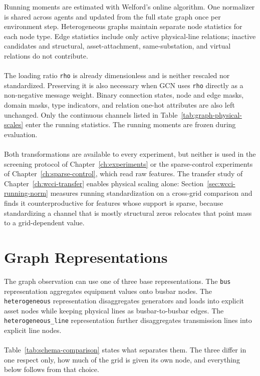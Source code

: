 Running moments are estimated with Welford's online algorithm. One normalizer
is shared across agents and updated from the full state graph once per
environment step. Heterogeneous graphs maintain separate node statistics for
each node type. Edge statistics include only active physical-line relations;
inactive candidates and structural, asset-attachment, same-substation, and
virtual relations do not contribute.
\\
\\
The loading ratio \texttt{rho} is already dimensionless and is neither rescaled
nor standardized. Preserving it is also necessary when GCN uses \texttt{rho}
directly as a non-negative message weight. Binary connection states, node and
edge masks, domain masks, type indicators, and relation one-hot attributes are
also left unchanged. Only the continuous channels listed in
Table~\ref{tab:graph-physical-scales} enter the running statistics.
The running moments are frozen during evaluation.
\\
\\
Both transformations are available to every experiment, but neither is used in
the screening protocol of Chapter~\ref{ch:experiments} or the sparse-control
experiments of Chapter~\ref{ch:sparse-control}, which read raw features. The
transfer study of Chapter~\ref{ch:wcci-transfer} enables physical scaling alone:
Section~\ref{sec:wcci-running-norm} measures running standardization on a
cross-grid comparison and finds it counterproductive for features whose support
is sparse, because standardizing a channel that is mostly structural zeros
relocates that point mass to a grid-dependent value.


\section{Graph Representations}
\label{sec:graph-representation}

The graph observation can use one of three base representations. The
\texttt{bus} representation aggregates equipment values onto busbar nodes. The
\texttt{heterogeneous} representation disaggregates generators and loads into
explicit asset nodes while keeping physical lines as busbar-to-busbar edges. The
\texttt{heterogeneous\_line} representation further disaggregates transmission
lines into explicit line nodes.
\\
\\
Table~\ref{tab:schema-comparison} states what separates them. The three differ
in one respect only, how much of the grid is given its own node, and everything
below follows from that choice.

